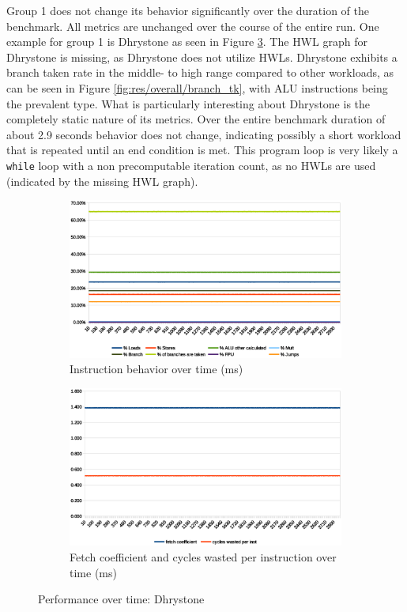 \documentclass[../bachelor_paper.tex]{subfiles}
\begin{document}
Group 1 does not change its behavior significantly over the duration of the benchmark. All metrics are unchanged over the course of the entire run. One example for group 1 is Dhrystone as seen in Figure \ref{fig:res/dhrystone}. The \ac{HWL} graph for Dhrystone is missing, as Dhrystone does not utilize \acp{HWL}. Dhrystone exhibits a branch taken rate in the middle- to high range compared to other workloads, as can be seen in Figure \ref{fig:res/overall/branch_tk}, with \ac{ALU} instructions being the prevalent type. What is particularly interesting about Dhrystone is the completely static nature of its metrics. Over the entire benchmark duration of about 2.9 seconds behavior does not change, indicating possibly a short workload that is repeated until an end condition is met. This program loop is very likely a \texttt{while} loop with a non precomputable iteration count, as no \acp{HWL} are used (indicated by the missing \ac{HWL} graph).

\begin{figure}
    \begin{subfigure}{\textwidth}
        \includegraphics[width=\textwidth]{img/graph/riscv/dhrystone_inst.eps}
        \caption{Instruction behavior over time (ms)}
        \label{fig:res/dhrystone/inst}
    \end{subfigure}
    \begin{subfigure}{\textwidth}
        \includegraphics[width=\textwidth]{img/graph/riscv/dhrystone_fetch_waste.eps}
        \caption{Fetch coefficient and cycles wasted per instruction over time (ms)}
        \label{fig:res/dhrystone/fetch_waste}
    \end{subfigure}
    \caption{Performance over time: Dhrystone}
    \label{fig:res/dhrystone}
\end{figure}
\end{document}
